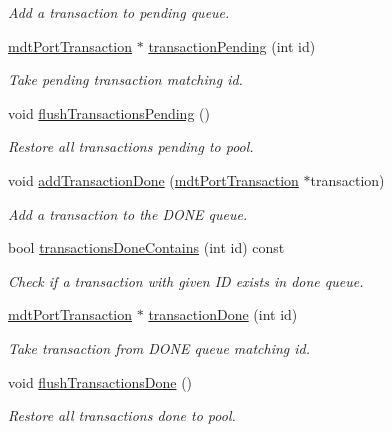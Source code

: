 \begin{DoxyCompactItemize}
\begin{DoxyCompactList}\small\item\em Add a transaction to pending queue. \end{DoxyCompactList}\item 
\hyperlink{classmdt_port_transaction}{mdt\-Port\-Transaction} $\ast$ \hyperlink{classmdt_port_manager_a18478707a9be7638b06cde48ced48297}{transaction\-Pending} (int id)
\begin{DoxyCompactList}\small\item\em Take pending transaction matching id. \end{DoxyCompactList}\item 
void \hyperlink{classmdt_port_manager_a85b87522eb9ec9b80ff24e3ad2ef4a00}{flush\-Transactions\-Pending} ()
\begin{DoxyCompactList}\small\item\em Restore all transactions pending to pool. \end{DoxyCompactList}\item 
void \hyperlink{classmdt_port_manager_a4b584d9005316be9991e6026e4c5e5a4}{add\-Transaction\-Done} (\hyperlink{classmdt_port_transaction}{mdt\-Port\-Transaction} $\ast$transaction)
\begin{DoxyCompactList}\small\item\em Add a transaction to the D\-O\-N\-E queue. \end{DoxyCompactList}\item 
bool \hyperlink{classmdt_port_manager_a3293066f4c3ed2e4b116f28dca8c5d64}{transactions\-Done\-Contains} (int id) const 
\begin{DoxyCompactList}\small\item\em Check if a transaction with given I\-D exists in done queue. \end{DoxyCompactList}\item 
\hyperlink{classmdt_port_transaction}{mdt\-Port\-Transaction} $\ast$ \hyperlink{classmdt_port_manager_a5869bcf6774a86fb9d3b00a0d4211bb5}{transaction\-Done} (int id)
\begin{DoxyCompactList}\small\item\em Take transaction from D\-O\-N\-E queue matching id. \end{DoxyCompactList}\item 
void \hyperlink{classmdt_port_manager_aad801de5f93a3619d98b7ea3cae6b999}{flush\-Transactions\-Done} ()
\begin{DoxyCompactList}\small\item\em Restore all transactions done to pool. \end{DoxyCompactList}\item 

\end{DoxyCompactItemize}
